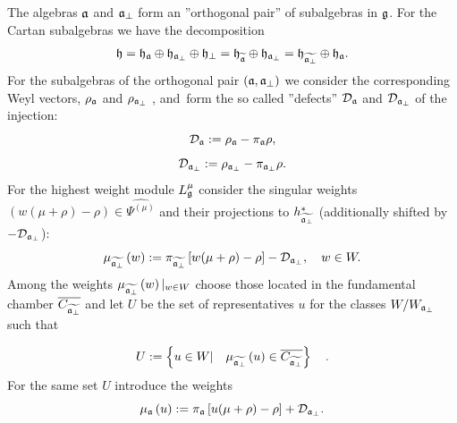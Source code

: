 \documentclass[12pt]{iopart}
\theoremstyle{definition}
\theoremstyle{definition}
\theoremstyle{definition}
\theoremstyle{definition}
\begin{document}
The algebras $\frak{a}$ and $\frak{a}_{\perp }$ form an ''orthogonal pair''
of subalgebras in $\frak{g}$. For the Cartan subalgebras we have the
decomposition
\begin{equation}
\frak{h}=\frak{\frak{h}_{\frak{a}}}\oplus \frak{h}_{\frak{a}_{\perp }}\oplus
\frak{h}_{\perp }=\frak{\frak{h}_{\widetilde{\frak{a}}}}\oplus \frak{h}_{%
\frak{a}_{\perp }}=\frak{\frak{h}_{\widetilde{\frak{a}_{\perp }}}}\oplus
\frak{h}_{\frak{a}}.
\end{equation}
For the subalgebras of the orthogonal pair $\left( \frak{a},\frak{a}_{\perp
}\right) $ we consider the corresponding Weyl vectors, $\rho _{\frak{a}}$
and $\rho _{\frak{a}_{\perp }}$ , and\ form the so called ''defects'' $%
\mathcal{D}_{\frak{a}}$ and $\mathcal{D}_{\frak{a}_{\perp }}$ of the
injection:
\begin{equation}
\mathcal{D}_{\frak{a}}:=\rho _{\frak{a}}-\pi _{\frak{a}}\rho ,
\end{equation}
\begin{equation}
\mathcal{D}_{\frak{a}_{\perp }}:=\rho _{\frak{a}_{\perp }}-\pi _{\frak{a}%
_{\perp }}\rho .
\end{equation}
For the highest weight module $L_{\frak{g}}^{\mu }$ consider the singular
weights $\left( w(\mu +\rho )-\rho \right) \in \widehat{\Psi ^{\left( \mu
\right) }}$ and their projections to $h_{\widetilde{\frak{a}_{\perp }}%
}^{\ast }$ (additionally shifted by $-\mathcal{D}_{\frak{a}_{\perp }}$):
\begin{equation*}
\mu _{\widetilde{\frak{a}_{\perp }}}\left( w\right) :=\pi _{\widetilde{\frak{%
a}_{\perp }}}\left[ w(\mu +\rho )-\rho \right] -\mathcal{D}_{\frak{a}_{\perp
}},\quad w\in W.
\end{equation*}
Among the weights $\mu _{\widetilde{\frak{a}_{\perp }}}\left( w\right)
|_{w\in W}$ choose those located in the fundamental chamber $\overline{C_{%
\widetilde{\frak{a}_{\perp }}}}$ and let $U$ be the set of representatives $%
u $ for the classes $W/W_{\frak{a}_{\perp }}$ such that

\begin{equation}
U:=\left\{ u\in W|\quad \mu _{\widetilde{\frak{a}_{\perp }}}\left( u\right)
\in \overline{C_{\widetilde{\frak{a}_{\perp }}}}\right\} \quad .
\label{U-def}
\end{equation}
For the same set $U$ introduce the weights
\begin{equation*}
\mu _{\frak{a}}\left( u\right) :=\pi _{\frak{a}}\left[ u(\mu +\rho )-\rho %
\right] +\mathcal{D}_{\frak{a}_{\perp }}.
\end{equation*}
\end{document}
